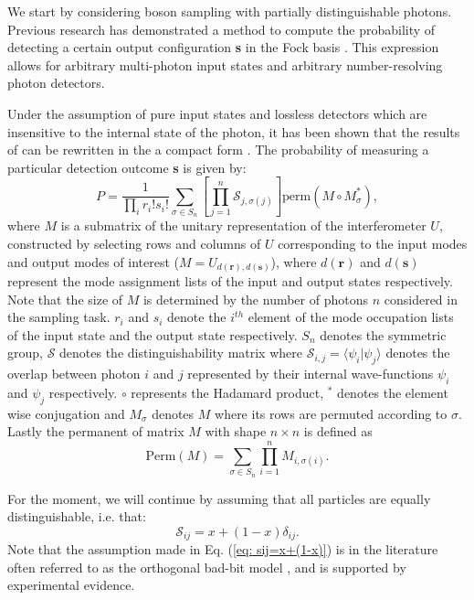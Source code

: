 \documentclass[10pt,aps,pra,twocolumn,superscriptaddress]{revtex4-2}
\begin{document}
We start by considering boson sampling with partially distinguishable photons. 
Previous research has demonstrated a method to compute the probability of detecting a certain output configuration \textbf{s} in the Fock basis \cite{shchesnovich2014sufficient,shchesnovich2015partial}.
This expression allows for arbitrary multi-photon input states and arbitrary number-resolving photon detectors. 

Under the assumption of pure input states and lossless detectors which are insensitive to the internal state of the photon, it has been shown that the results of \cite{shchesnovich2014sufficient,shchesnovich2015partial} can be rewritten in the a compact form \cite{tichy2015sampling}. The probability of measuring a particular detection outcome \textbf{s} is given by:
\begin{equation}
    P=\frac{1}{\prod_i r_i! s_i!} \sum_{\sigma \in S_n} \left [ \prod^n_{j=1} \mathcal{S}_{j,\sigma(j)}\right ] \mathrm{perm}(M \circ M^{*}_{\sigma}),
    \label{eq:Tichy,multiperm}
\end{equation}
where $M$ is a submatrix of the unitary representation of the interferometer $U$, constructed by selecting rows and columns of $U$ corresponding to the input modes and output modes of interest ($M=U_{d(\textbf{r}),d(\textbf{s})}$), where $d(\textbf{r})$ and $d(\textbf{s})$ represent the mode assignment lists of the input and output states respectively. Note that the size of $M$ is determined by the number of photons $n$ considered in the sampling task. $r_i$ and $s_i$ denote the $i^{th}$ element of the mode occupation lists of the input state and the output state respectively. $S_n$ denotes the symmetric group, $\mathcal{S}$ denotes the distinguishability matrix where $\mathcal{S}_{i,j}=\langle \psi_i|\psi_j\rangle$ denotes the overlap between photon $i$ and $j$ represented by their internal wave-functions $\psi_i$ and $\psi_j$ respectively.  $\circ$ represents the Hadamard product, $^*$ denotes the element wise conjugation and $M_{\sigma}$ denotes $M$ where its rows are permuted according to $\sigma$. Lastly the permanent of matrix $M$ with shape $n \times n$ is defined as 
\begin{equation}
        \text{Perm}(M) = \sum_{\sigma \in S_n}\prod_{i=1}^n M_{i, \sigma(i)}.
\end{equation}

For the moment, we will continue by assuming that all particles are equally distinguishable, i.e. that: 
\begin{equation}
        \mathcal{S}_{ij}=x+(1-x)\delta_{ij}.
    \label{eq: sij=x+(1-x)}
\end{equation}
Note that the assumption made in Eq. (\ref{eq: sij=x+(1-x)}) is in the literature often referred to as the orthogonal bad-bit model \cite{sparrow2018phd_thesis, shaw2023errors}, and is supported by experimental evidence. 
\end{document}
